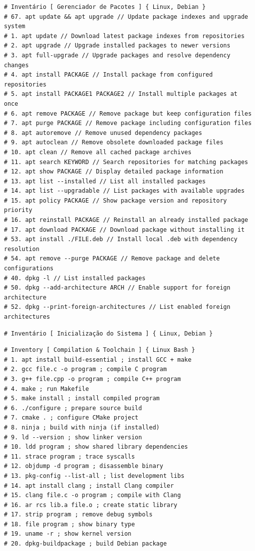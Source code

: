 \documentclass[12pt,a4paper]{article}
\begin{document}
\begin{lstlisting}
# Inventário [ Gerenciador de Pacotes ] { Linux, Debian }
# 67. apt update && apt upgrade // Update package indexes and upgrade system
# 1. apt update // Download latest package indexes from repositories
# 2. apt upgrade // Upgrade installed packages to newer versions
# 3. apt full-upgrade // Upgrade packages and resolve dependency changes
# 4. apt install PACKAGE // Install package from configured repositories
# 5. apt install PACKAGE1 PACKAGE2 // Install multiple packages at once
# 6. apt remove PACKAGE // Remove package but keep configuration files
# 7. apt purge PACKAGE // Remove package including configuration files
# 8. apt autoremove // Remove unused dependency packages
# 9. apt autoclean // Remove obsolete downloaded package files
# 10. apt clean // Remove all cached package archives
# 11. apt search KEYWORD // Search repositories for matching packages
# 12. apt show PACKAGE // Display detailed package information
# 13. apt list --installed // List all installed packages
# 14. apt list --upgradable // List packages with available upgrades
# 15. apt policy PACKAGE // Show package version and repository priority
# 16. apt reinstall PACKAGE // Reinstall an already installed package
# 17. apt download PACKAGE // Download package without installing it
# 53. apt install ./FILE.deb // Install local .deb with dependency resolution
# 54. apt remove --purge PACKAGE // Remove package and delete configurations
# 40. dpkg -l // List installed packages
# 50. dpkg --add-architecture ARCH // Enable support for foreign architecture
# 52. dpkg --print-foreign-architectures // List enabled foreign architectures
\end{lstlisting}

\begin{lstlisting}
# Inventário [ Inicialização do Sistema ] { Linux, Debian }

\end{lstlisting}

\begin{lstlisting}
# Inventory [ Compilation & Toolchain ] { Linux Bash }
# 1. apt install build-essential ; install GCC + make
# 2. gcc file.c -o program ; compile C program
# 3. g++ file.cpp -o program ; compile C++ program
# 4. make ; run Makefile
# 5. make install ; install compiled program
# 6. ./configure ; prepare source build
# 7. cmake . ; configure CMake project
# 8. ninja ; build with ninja (if installed)
# 9. ld --version ; show linker version
# 10. ldd program ; show shared library dependencies
# 11. strace program ; trace syscalls
# 12. objdump -d program ; disassemble binary
# 13. pkg-config --list-all ; list development libs
# 14. apt install clang ; install Clang compiler
# 15. clang file.c -o program ; compile with Clang
# 16. ar rcs lib.a file.o ; create static library
# 17. strip program ; remove debug symbols
# 18. file program ; show binary type
# 19. uname -r ; show kernel version
# 20. dpkg-buildpackage ; build Debian package
\end{lstlisting}
\end{document}
